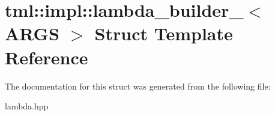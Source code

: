 \hypertarget{structtml_1_1impl_1_1lambda__builder__2}{\section{tml\+:\+:impl\+:\+:lambda\+\_\+builder\+\_$<$ A\+R\+G\+S $>$ Struct Template Reference}
\label{structtml_1_1impl_1_1lambda__builder__2}
}


The documentation for this struct was generated from the following file\+:\begin{DoxyCompactItemize}
\item 
lambda.\+hpp\end{DoxyCompactItemize}
